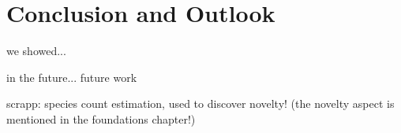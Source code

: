 
\chapter{Conclusion and Outlook}
\label{ch:ConclusionOutlook}

we showed...

in the future...
future work

scrapp: species count estimation, used to discover novelty! (the novelty aspect is mentioned in the foundations chapter!)
